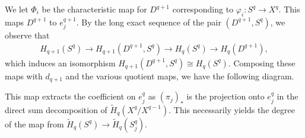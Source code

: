 \documentclass[10pt]{mypackage}
\begin{document}
\begin{solution}
  We let $\Phi_i$ be the characteristic map for $D^{q+1}$ corresponding to $\varphi_i\colon S^q\rightarrow X^q$. This maps $D^{q+1}$ to $e^{q+1}_{j}$. By the long exact sequence of the pair $\left( D^{q+1},S^q \right)$, we observe that
  \begin{align*}
    H_{q+1}\left( S^q \right)\rightarrow H_{q+1}\left( D^{q+1},S^q \right)\rightarrow H_{q}\left( S^q \right)\rightarrow H_q\left( D^{q+1} \right),
  \end{align*}
  which induces an isomorphism $ H_{q+1}\left( D^{q+1},S^q \right)\cong H_q\left( S^q \right) $. Composing these maps with $d_{q+1}$ and the various quotient maps, we have the following diagram.
  \begin{center}
    
  \end{center}
  This map extracts the coefficient on $e_{j}^{q}$ as $\left( \pi_j \right)_{\ast}$ is the projection onto $e_j^{q}$ in the direct sum decomposition of $ \widetilde{H}_q\left( X^q/X^{q-1} \right) $. This necessarily yields the degree of the map from $ \widetilde{H}_{q}\left( S^q \right)\rightarrow \widetilde{H}_q\left( S^q_{j} \right) $.
\end{solution}
\end{document}
